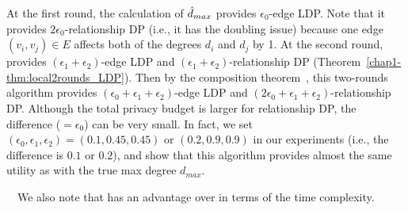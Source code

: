 
At the first round, the calculation of $\hat{d}_{max}$ provides $\epsilon_0$-edge LDP. 
Note that it provides $2\epsilon_0$-relationship DP (i.e., it has the doubling issue) because one edge $(v_i,v_j) \in E$ affects both of the degrees $d_i$ and $d_j$ by 1. 
At the second round,  provides $(\epsilon_1 + \epsilon_2)$-edge LDP and 
$(\epsilon_1 + \epsilon_2)$-relationship DP (Theorem~\ref{chap1-thm:local2rounds_LDP}). 
Then by the composition theorem~\cite{DP}, this two-rounds algorithm provides $(\epsilon_0 + \epsilon_1 + \epsilon_2)$-edge LDP and $(2\epsilon_0 + \epsilon_1 + \epsilon_2)$-relationship DP. 
Although the total privacy budget is larger for relationship DP, the difference ($=\epsilon_0$) can be very small. 
In fact, we set $(\epsilon_0, \epsilon_1, \epsilon_2) = (0.1, 0.45, 0.45)$ or $(0.2, 0.9, 0.9)$ in our experiments (i.e., the difference is $0.1$ or $0.2$), and show that this algorithm provides almost the same utility as  with the true max degree $d_{max}$. 

\smallskip
{}~~We also note that  has an advantage over  in terms of the time complexity. 

